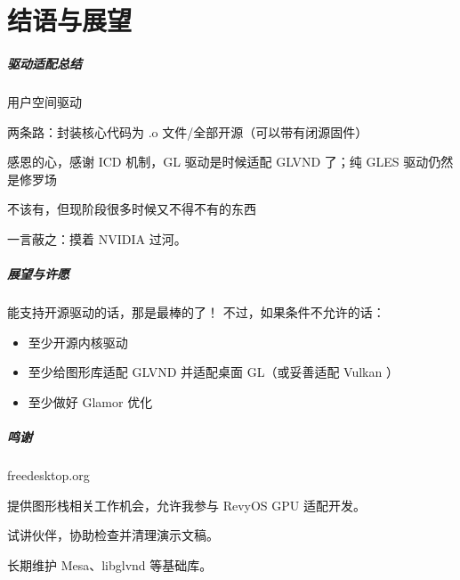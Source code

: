 \documentclass{ctexbeamer}
\begin{document}
\part{结语与展望}
\frame{\partpage}

\begin{frame}
    \frametitle{驱动适配总结}
    \begin{labeling}{用户空间驱动}
        \item [内核驱动] 两条路：封装核心代码为 .o 文件/全部开源（可以带有闭源固件）
        \item [用户空间驱动] 感恩的心，感谢 ICD 机制，GL 驱动是时候适配 GLVND 了；纯 GLES 驱动仍然是修罗场
        \item [DDX] 不该有，但现阶段很多时候又不得不有的东西
    \end{labeling}
    \hfill \break
    一言蔽之：摸着 NVIDIA 过河。
\end{frame}

\begin{frame}
    \frametitle{展望与许愿}
    能支持开源驱动的话，那是最棒的了！
    不过，如果条件不允许的话：
    \begin{itemize}
        \item 至少开源内核驱动
        \item 至少给图形库适配 GLVND 并适配桌面 GL（或妥善适配 Vulkan ）
        \item 至少做好 Glamor 优化
    \end{itemize}
\end{frame}

\begin{frame}
    \frametitle{鸣谢}
    \begin{labeling}{freedesktop.org}
        \item [PLCT 实验室] 提供图形栈相关工作机会，允许我参与 RevyOS GPU 适配开发。
	\item [\href{https://github.com/Rongronggg9}{\textcolor{blue}{@Rongronggg9}}] 试讲伙伴，协助检查并清理演示文稿。
        \item [freedesktop.org] 长期维护 Mesa、libglvnd 等基础库。
    \end{labeling}
\end{frame}
\end{document}
